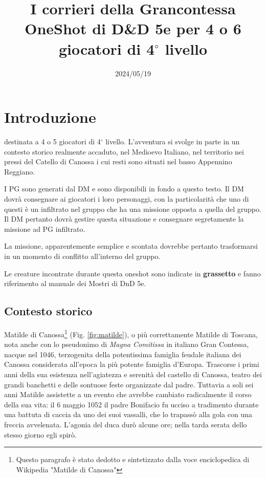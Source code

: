 \documentclass[letterpaper,twocolumn,openany,nodeprecatedcode]{dndbook}
\title{I corrieri della Grancontessa \\
\large OneShot di D\&D 5e per 4 o 6 giocatori di 4$^\circ$ livello}
\author{}
\date{2024/05/19}
\begin{document}
\frontmatter

\maketitle

\tableofcontents


\mainmatter%





\chapter{Introduzione}

 destinata a 4 o 5 giocatori di 4$^\circ$ livello. L'avventura si svolge in parte in un contesto storico realmente accaduto, nel Medioevo Italiano, nel territorio nei pressi del Catello di Canossa i cui resti sono situati nel basso Appennino Reggiano.

I PG sono generati dal DM e sono disponibili in fondo a questo testo. Il DM dovrà consegnare ai giocatori i loro personaggi, con la particolarità che uno di questi è un infiltrato nel gruppo che ha una missione opposta a quella del gruppo. Il DM pertanto dovrà gestire questa situazione e consegnare segretamente la missione ad PG infiltrato.

La missione, apparentemente semplice e scontata dovrebbe pertanto trasformarsi in un momento di conflitto all'interno del gruppo.

Le creature incontrate durante questa oneshot sono indicate in \textbf{grassetto} e fanno riferimento al manuale dei Mostri di DnD 5e\cite{dnd:mostri}.

\section{Contesto storico}


Matilde di Canossa\footnote{Questo paragrafo è stato dedotto e sintetizzato dalla voce enciclopedica di Wikipedia "Matilde di Canossa"} (Fig. \ref{fig:matilde})\cite{wiki:matilde}, o più correttamente Matilde di Toscana, nota anche con lo pseudonimo di \textit{Magna Comitissa} in italiano Gran Contessa, nacque nel 1046, terzogenita della potentissima famiglia feudale italiana dei Canossa considerata all'epoca la più potente famiglia d'Europa. Trascorse i primi anni della sua esistenza nell'agiatezza e serenità del castello di Canossa, teatro dei grandi banchetti e delle sontuose feste organizzate dal padre. Tuttavia a soli sei anni Matilde assistette a un evento che avrebbe cambiato radicalmente il corso della sua vita: il 6 maggio 1052 il padre Bonifacio fu ucciso a tradimento durante una battuta di caccia da uno dei suoi vassalli, che lo trapassò alla gola con una freccia avvelenata. L'agonia del duca durò alcune ore; nella tarda serata dello stesso giorno egli spirò.
\end{document}
